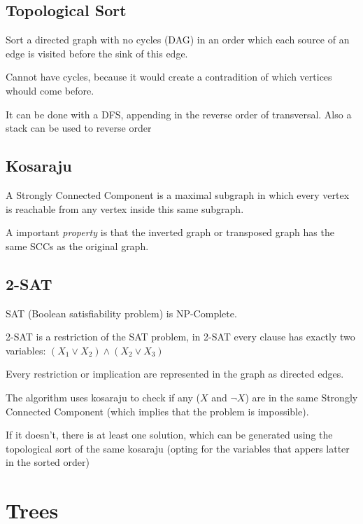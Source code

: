 	\subsection{Topological Sort}

	Sort a directed graph with no cycles (DAG) in an order which each source of an edge is visited before the sink of this edge.

	Cannot have cycles, because it would create a contradition of which vertices whould come before.

	It can be done with a DFS, appending in the reverse order of transversal. Also a stack can be used to reverse order	


	\subsection{Kosaraju}

	A Strongly Connected Component is a maximal subgraph in which every vertex is reachable
	from any vertex inside this same subgraph.

	A important \textit{property} is that the inverted graph or transposed graph has the same SCCs
	as the original graph.


	\subsection{2-SAT}
	
		SAT (Boolean satisfiability problem) is NP-Complete.

		2-SAT is a restriction of the SAT problem, in 2-SAT every clause has exactly two variables:
		$ (X_1 \vee X_2) \wedge (X_2 \vee X_3) $

		Every restriction or implication are represented in the graph as directed edges.

		The algorithm uses kosaraju to check if any ($X$ and $\neg{X}$) are in the same Strongly Connected Component 
		(which implies that the problem is impossible). 

		If it doesn't, there is at least one solution, which can be generated using the topological sort of the same kosaraju 
		(opting for the variables that appers latter in the sorted order)


\section{Trees}



